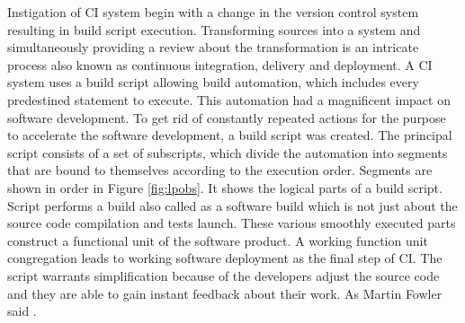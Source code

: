 Instigation of CI system begin with a change in the version control system resulting in build script execution. Transforming sources into a system and simultaneously providing a review about the transformation is an intricate process also known as continuous integration, delivery and deployment. A CI system uses a build script allowing build automation, which includes every predestined statement to execute. This automation had a magnificent impact on software development. To get rid of constantly repeated actions for the purpose to accelerate the software development, a build script was created. The principal script consists of a set of subscripts, which divide the automation into segments that are bound to themselves according to the execution order. Segments are shown in order in Figure \ref{fig:lpobs}. It shows the logical parts of a build script. Script performs a build also called as a software build which is not just about the source code compilation and tests launch. These various smoothly executed parts construct a functional unit of the software product. A working function unit congregation leads to working software deployment as the final step of CI. The script warrants simplification because of the developers adjust the source code and they are able to gain instant feedback about their work. As Martin Fowler said  \cite{MartinFowler}.

